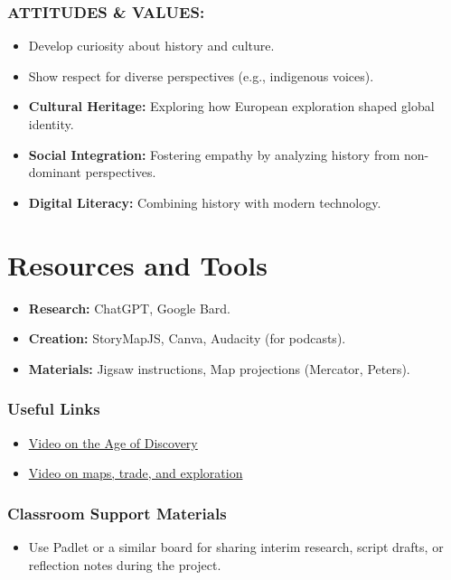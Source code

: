 \documentclass[11pt, a4paper]{article}
\begin{document}
\subsubsection*{ATTITUDES \& VALUES:}
\begin{itemize}
    \item Develop curiosity about history and culture.
    \item Show respect for diverse perspectives (e.g., indigenous voices).
\end{itemize}

\begin{eurobox}
\begin{itemize}
    \item \textbf{Cultural Heritage:} Exploring how European exploration shaped global identity.
    \item \textbf{Social Integration:} Fostering empathy by analyzing history from non-dominant perspectives.
    \item \textbf{Digital Literacy:} Combining history with modern technology.
\end{itemize}
\end{eurobox}

\newpage
\section{Resources and Tools}
\begin{itemize}
    \item \textbf{Research:} ChatGPT, Google Bard.
    \item \textbf{Creation:} StoryMapJS, Canva, Audacity (for podcasts).
    \item \textbf{Materials:} Jigsaw instructions, Map projections (Mercator, Peters).
\end{itemize}

\subsubsection*{Useful Links}
\begin{itemize}
    \item \href{https://www.youtube.com/watch?v=sGeXtUZQScc}{Video on the Age of Discovery}
    \item \href{https://www.youtube.com/watch?v=wTjgBrlhzRs}{Video on maps, trade, and exploration}
\end{itemize}

\subsubsection*{Classroom Support Materials}
\begin{itemize}
    \item Use Padlet or a similar board for sharing interim research, script drafts, or reflection notes during the project.
\end{itemize}
\end{document}
